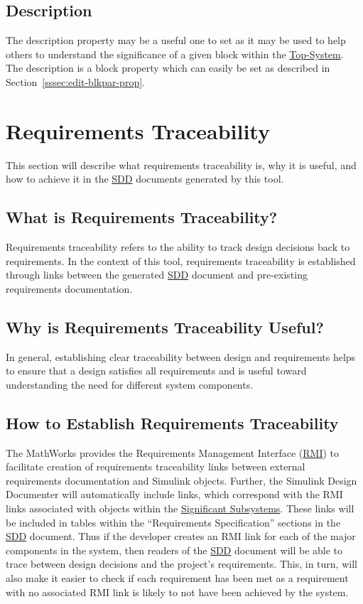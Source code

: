 \documentclass{mcscert}
\newcommand{\mathworks}{The MathWorks}
\newcommand{\simulink}{Simulink}
\newcommand{\sddtool}{Simulink Design Documenter}
\newcommand{\topsystemnolink}{Top-System} %
\newcommand{\topsystem}{\hyperref[def:topsystem]{\topsystemnolink{}}}
\newcommand{\sigsubsnolink}{Significant Subsystems} %
\newcommand{\sigsubs}{\hyperref[def:sigsubs]{\sigsubsnolink{}}}
\begin{document}
	\subsection{Description}
	\label{ssec:include-int-descr}
	The description property may be a useful one to set as it may be used to help others to understand the significance of a given block within the \topsystem{}. The description is a block property which can easily be set as described in Section~\ref{sssec:edit-blkpar-prop}.

\section{Requirements Traceability}
\label{sec:req-trace}
This section will describe what requirements traceability is, why it is useful, and how to achieve it in the \hyperref[acr:sdd]{SDD} documents generated by this tool. 
		
	\subsection{What is Requirements Traceability?}
	Requirements traceability refers to the ability to track design decisions back to requirements. 
	In the context of this tool, requirements traceability is established through links between the generated \hyperref[acr:sdd]{SDD} document and pre-existing requirements documentation.
	  
	\subsection{Why is Requirements Traceability Useful?}
	In general, establishing clear traceability between design and requirements helps to ensure that a design satisfies all requirements and is useful toward understanding the need for different system components.

	\subsection{How to Establish Requirements Traceability}
	\mathworks{} provides the Requirements Management Interface (\hyperref[acr:rmi]{RMI}) to facilitate creation of requirements traceability links between external requirements documentation and \simulink{} objects. 
	Further, the \sddtool{} will automatically include links, which correspond with the RMI links associated with objects within the \sigsubs{}. 
	These links will be included in tables within the ``Requirements Specification'' sections in the \hyperref[acr:sdd]{SDD} document. 
	Thus if the developer creates an RMI link for each of the major components in the system, then readers of the \hyperref[acr:sdd]{SDD} document will be able to trace between design decisions and the project's requirements. 
	This, in turn, will also make it easier to check if each requirement has been met as a requirement with no associated RMI link is likely to not have been achieved by the system.
      
\end{document}
